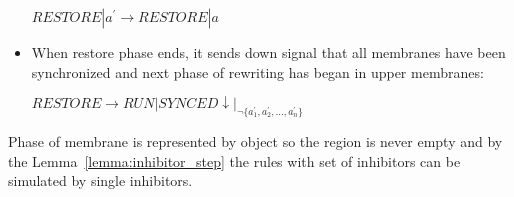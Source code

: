 \begin{dokaz}
\begin{itemize}
    $RESTORE|a^{\prime} \rightarrow RESTORE|a$

    \item When restore phase ends, it sends down signal that all membranes have been synchronized and next phase of rewriting has began in upper membranes:

    $RESTORE \rightarrow RUN|SYNCED\downarrow|_{\neg \{a_1^{\prime}, a_2^{\prime}, \dots, a_n^{\prime}\}}$
  \end{itemize}


  Phase of membrane is represented by object so the region is never empty and by the Lemma~\ref{lemma:inhibitor_step} the rules with set of inhibitors can be simulated by single inhibitors.
\end{dokaz}